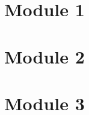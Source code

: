 

\def\title{Final Review Session}

\newcommand{\qitem}{\qpart\item}

\renewcommand{\labelenumi}{(\alph{enumi})} %
\renewcommand{\theenumi}{(\alph{enumi})} %
\renewcommand{\labelenumii}{\roman{enumii}.} %
\renewcommand{\theenumii}{\roman{enumii}.}

\maketitle

\vspace{0.5em}

\section{Module 1}

\newpage
\section{Module 2}

\newpage
\section{Module 3}



